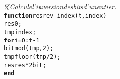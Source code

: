 {\begin{tabbing}
\textit{\%\phantom{x}Calcule\phantom{x}l{'}inversion\phantom{x}des\phantom{x}bits\phantom{x}d{'}un\phantom{x}entier{.}}\\
\texttt{\textbf{function}}\texttt{\phantom{x}res\phantom{x}{=}\phantom{x}rev\_{}index{(}t{,}index{)}}\\
\texttt{res\phantom{x}{=}\phantom{x}0{;}}\\
\texttt{tmp\phantom{x}{=}\phantom{x}index{;}}\\
\texttt{\textbf{for}}\texttt{\phantom{x}i{=}0{:}t{-}1}\\
\texttt{\phantom{xxxx}bit\phantom{x}{=}\phantom{x}mod{(}tmp{,}2{)}{;}}\\
\texttt{\phantom{xxxx}tmp\phantom{x}{=}\phantom{x}floor{(}tmp{/}2{)}{;}}\\
\texttt{\phantom{xxxx}res\phantom{x}{=}\phantom{x}res{*}2\phantom{x}{+}\phantom{x}bit{;}}\\
\texttt{\textbf{end}}
\end{tabbing}}